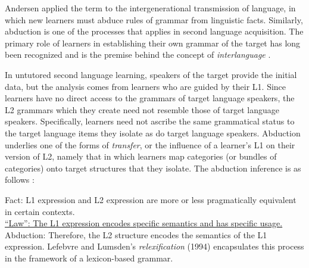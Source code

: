 Andersen applied the term to the intergenerational transmission of language, in which new learners must abduce rules of grammar from linguistic facts. Similarly, abduction is one of the processes that applies in second language acquisition. The primary role of learners in establishing their own grammar of the target has long been recognized and is the premise behind the concept of \textit{interlanguage} \citep{Selinker1972}. 

In untutored second language learning, speakers of the target provide the initial data, but the analysis comes from learners who are guided by their L1. Since learners have no direct access to the grammars of target language speakers, the L2 grammars which they create need not resemble those of target language speakers. Specifically, learners need not ascribe the same grammatical status to the target language items they isolate as do target language speakers. Abduction underlies one of the forms of \textit{transfer}, or the influence of a learner's L1 on their version of L2, namely that in which learners map categories (or bundles of categories) onto target structures that they isolate. The abduction inference is as follows \citep[cf.][292-6]{Smith1985dev}:

\ea
Fact: L1 expression and L2 expression are more or less pragmatically equivalent in certain contexts. \\
\underline{``Law'': The L1 expression encodes specific semantics and has specific usage. }\\
Abduction: Therefore, the L2 structure encodes the semantics of the L1 expression.
\z
Lefebvre and Lumsden's \textit{relexification} (1994) encapsulates this process in the framework of a lexicon-based grammar.\nocite{LefebvreEtAl1994}


